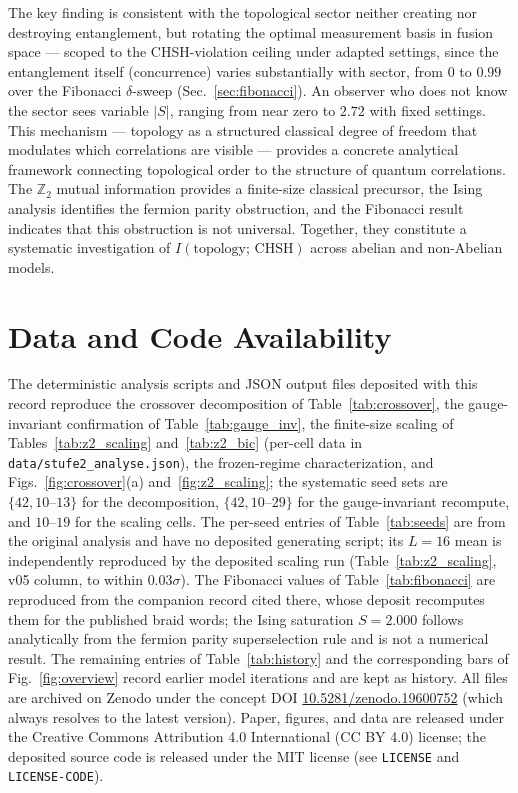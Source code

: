 \documentclass[aps,pra,twocolumn,superscriptaddress,showpacs,floatfix]{revtex4-2}
\newcommand{\Ztwo}{\mathbb{Z}_2}
\begin{document}
The key finding is consistent with the topological sector neither creating nor
destroying entanglement, but rotating the optimal measurement basis in fusion
space --- scoped to the CHSH-violation ceiling under adapted settings, since
the entanglement itself (concurrence) varies substantially with sector, from
$0$ to $0.99$ over the Fibonacci $\delta$-sweep (Sec.~\ref{sec:fibonacci}). An
observer who does not know the sector sees variable $|S|$, ranging from near
zero to $2.72$ with fixed settings. This mechanism --- topology as a structured
classical degree of freedom that modulates which correlations are visible ---
provides a concrete analytical framework connecting topological order to the
structure of quantum correlations. The $\Ztwo$
mutual information provides a finite-size classical precursor, the Ising analysis
identifies the fermion parity obstruction, and the Fibonacci result
indicates that this obstruction is not universal. Together, they constitute a
systematic investigation of $I(\text{topology};\,\text{CHSH})$ across abelian and
non-Abelian models.

\section*{Data and Code Availability}
The deterministic analysis scripts and JSON output files deposited with this
record reproduce the crossover decomposition of Table~\ref{tab:crossover}, the
gauge-invariant confirmation of Table~\ref{tab:gauge_inv}, the finite-size
scaling of Tables~\ref{tab:z2_scaling} and~\ref{tab:z2_bic} (per-cell data in
\texttt{data/stufe2\_analyse.json}), the frozen-regime characterization, and
Figs.~\ref{fig:crossover}(a) and~\ref{fig:z2_scaling}; the systematic seed sets
are $\{42, 10\text{--}13\}$ for the decomposition, $\{42, 10\text{--}29\}$ for
the gauge-invariant recompute, and $10\text{--}19$ for the scaling cells. The
per-seed entries of Table~\ref{tab:seeds} are from the original analysis and
have no deposited generating script; its $L = 16$ mean is independently
reproduced by the deposited scaling run (Table~\ref{tab:z2_scaling}, v05
column, to within $0.03\sigma$). The Fibonacci values of
Table~\ref{tab:fibonacci} are reproduced from the companion record cited
there, whose deposit recomputes them for the published braid words; the Ising
saturation $S = 2.000$ follows analytically from the fermion parity
superselection rule and is not a numerical result. The remaining entries of
Table~\ref{tab:history} and the corresponding bars of Fig.~\ref{fig:overview}
record earlier model iterations and are kept as history. All files are
archived on Zenodo under the concept DOI
\href{https://doi.org/10.5281/zenodo.19600752}{10.5281/zenodo.19600752} (which
always resolves to the latest version). Paper, figures, and data are released
under the Creative Commons Attribution 4.0 International (CC BY 4.0) license;
the deposited source code is released under the MIT license (see
\texttt{LICENSE} and \texttt{LICENSE-CODE}).
\end{document}
